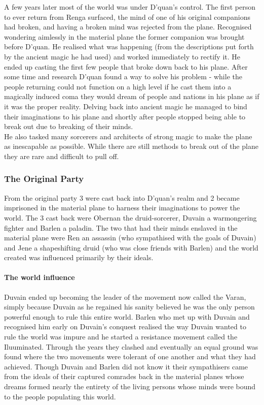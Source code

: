 \documentclass[10pt,twoside,twocolumn]{article}
\begin{document}
A few years later most of the world was under D'quan's control. The first person to ever return from Renga surfaced, the mind of one of his original companions had broken, and having a broken mind was rejected from the plane. Recognised wondering aimlessly in the material plane the former companion was brought before D'quan. He realised what was happening (from the descriptions put forth by the ancient magic he had used) and worked immediately to rectify it. He ended up casting the first few people that broke down back to his plane. After some time and research D'quan found a way to solve his problem - while the people returning could not function on a high level if he cast them into a magically induced coma they would dream of people and nations in his plane as if it was the proper reality. Delving back into ancient magic he managed to bind their imaginations to his plane and shortly after people stopped being able to break out due to breaking of their minds.\\

He also tasked many sorcerers and architects of strong magic to make the plane as inescapable as possible. While there are still methods to break out of the plane they are rare and difficult to pull off.\\

\subsubsection{The Original Party}
From the original party 3 were cast back into D'quan's realm and 2 became imprisoned in the material plane to harness their imaginations to power the world. The 3 cast back were Obernan the druid-sorcerer, Duvain a warmongering fighter and Barlen a paladin. The two that had their minds enslaved in the material plane were Ren an assassin (who sympathised with the goals of Duvain) and Jene a shapeshifting druid (who was close friends with Barlen) and the world created was influenced primarily by their ideals.\\

\paragraph{The world influence}
Duvain ended up becoming the leader of the movement now called the Varan, simply because Duvain as he regained his sanity believed he was the only person powerful enough to rule this entire world. Barlen who met up with Duvain and recognised him early on Duvain's conquest realised the way Duvain wanted to rule the world was impure and he started a resistance movement called the Iluuminated. Through the years they clashed and eventually an equal ground was found where the two movements were tolerant of one another and what they had achieved. Though Duvain and Barlen did not know it their sympathisers came from the ideals of their captured comrades back in the material planes whose dreams formed nearly the entirety of the living persons whose minds were bound to the people populating this world.\\
\end{document}
